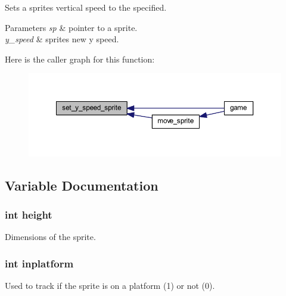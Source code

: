 Sets a sprite\textquotesingle{}s vertical speed to the specified. 


\begin{DoxyParams}{Parameters}
{\em sp} & pointer to a sprite. \\
\hline
{\em y\+\_\+speed} & sprite\textquotesingle{}s new y speed. \\
\hline
\end{DoxyParams}


Here is the caller graph for this function\+:\nopagebreak
\begin{figure}[H]
\begin{center}
\leavevmode
\includegraphics[width=350pt]{group__sprite_ga4ca599f2889585f0c7a78ec6622d6928_icgraph}
\end{center}
\end{figure}




\subsection{Variable Documentation}
\hypertarget{group__sprite_gad12fc34ce789bce6c8a05d8a17138534}{}
\subsubsection[{height}]{\setlength{\rightskip}{0pt plus 5cm}int height}\label{group__sprite_gad12fc34ce789bce6c8a05d8a17138534}
Dimensions of the sprite. \hypertarget{group__sprite_ga44675e845628c15d8a696990a9494d04}{}
\subsubsection[{inplatform}]{\setlength{\rightskip}{0pt plus 5cm}int inplatform}\label{group__sprite_ga44675e845628c15d8a696990a9494d04}
Used to track if the sprite is on a platform (1) or not (0). \hypertarget{group__sprite_gad427edc16087f64ef18fb771dd34cc0b}{}
